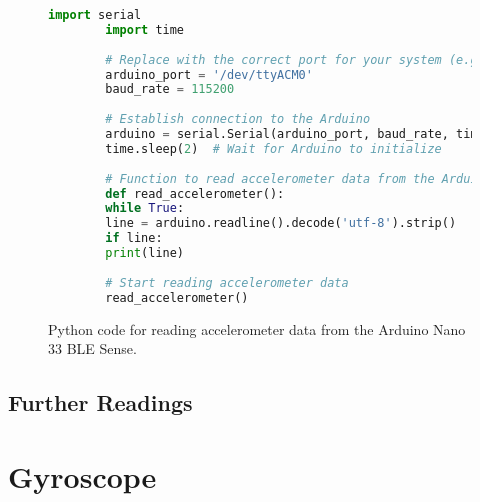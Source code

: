 \begin{figure}[h!]
	\centering
	\begin{lstlisting}[style=pythonstyle ,language=python, caption={Accelerometer testing in pyserial}, label={lst:arduino_accelerometer}]
		import serial
		import time
		
		# Replace with the correct port for your system (e.g., 'COM3' on Windows or '/dev/ttyACM0' on Linux)
		arduino_port = '/dev/ttyACM0'  
		baud_rate = 115200
		
		# Establish connection to the Arduino
		arduino = serial.Serial(arduino_port, baud_rate, timeout=1)
		time.sleep(2)  # Wait for Arduino to initialize
		
		# Function to read accelerometer data from the Arduino
		def read_accelerometer():
		while True:
		line = arduino.readline().decode('utf-8').strip()
		if line:
		print(line)
		
		# Start reading accelerometer data
		read_accelerometer()
	\end{lstlisting}
	\caption{Python code for reading accelerometer data from the Arduino Nano 33 BLE Sense.}
	\label{lst:python_code}
\end{figure}

\subsection{Further Readings}

\section{Gyroscope}
